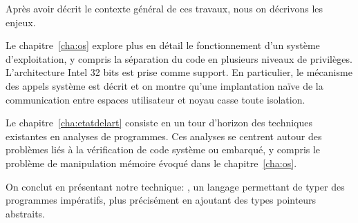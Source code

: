 \begin{headingpage}

Après avoir décrit le contexte général de ces travaux, nous on décrivons les
enjeux.

Le chapitre~\ref{cha:os} explore plus en détail le fonctionnement d'un système
d'exploitation, y compris la séparation du code en plusieurs niveaux de
privilèges. L'architecture Intel 32 bits est prise comme support. En
particulier, le mécanisme des appels système est décrit et on montre qu'une
implantation naïve de la communication entre espaces utilisateur et noyau casse
toute isolation.

Le chapitre~\ref{cha:etatdelart} consiste en un tour d'horizon des techniques
existantes en analyses de programmes. Ces analyses se centrent autour des
problèmes liés à la vérification de code système ou embarqué, y compris le
problème de manipulation mémoire évoqué dans le chapitre~\ref{cha:os}.

On conclut en présentant notre technique: \langname, un langage permettant de
typer des programmes impératifs, plus précisément en ajoutant des types
pointeurs abstraits.

\end{headingpage}
